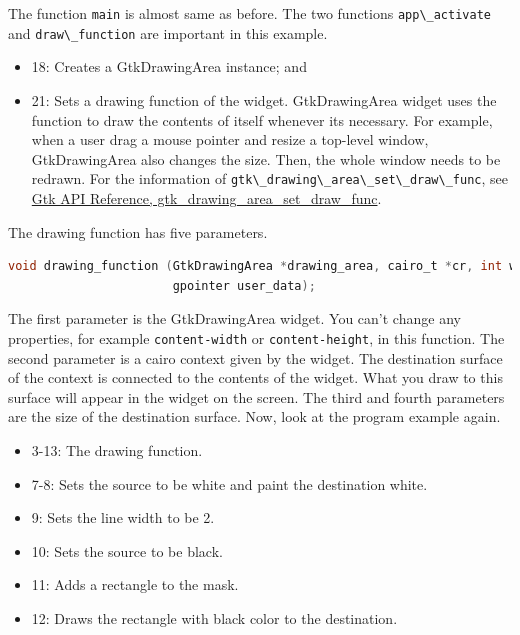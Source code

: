 The function \passthrough{\lstinline!main!} is almost same as before.
The two functions \passthrough{\lstinline!app\_activate!} and
\passthrough{\lstinline!draw\_function!} are important in this example.

\begin{itemize}
\tightlist
\item
  18: Creates a GtkDrawingArea instance; and
\item
  21: Sets a drawing function of the widget. GtkDrawingArea widget uses
  the function to draw the contents of itself whenever its necessary.
  For example, when a user drag a mouse pointer and resize a top-level
  window, GtkDrawingArea also changes the size. Then, the whole window
  needs to be redrawn. For the information of
  \passthrough{\lstinline!gtk\_drawing\_area\_set\_draw\_func!}, see
  \href{https://docs.gtk.org/gtk4/method.DrawingArea.set_draw_func.html}{Gtk
  API Reference, gtk\_drawing\_area\_set\_draw\_func}.
\end{itemize}

The drawing function has five parameters.

\begin{lstlisting}[language=C]
void drawing_function (GtkDrawingArea *drawing_area, cairo_t *cr, int width, int height,
                       gpointer user_data);
\end{lstlisting}

The first parameter is the GtkDrawingArea widget. You can't change any
properties, for example \passthrough{\lstinline!content-width!} or
\passthrough{\lstinline!content-height!}, in this function. The second
parameter is a cairo context given by the widget. The destination
surface of the context is connected to the contents of the widget. What
you draw to this surface will appear in the widget on the screen. The
third and fourth parameters are the size of the destination surface.
Now, look at the program example again.

\begin{itemize}
\tightlist
\item
  3-13: The drawing function.
\item
  7-8: Sets the source to be white and paint the destination white.
\item
  9: Sets the line width to be 2.
\item
  10: Sets the source to be black.
\item
  11: Adds a rectangle to the mask.
\item
  12: Draws the rectangle with black color to the destination.
\end{itemize}

